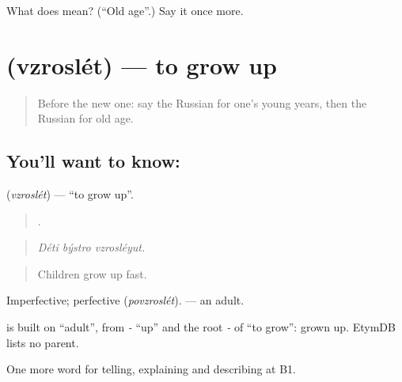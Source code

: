 \begin{tcolorbox}[breakable,colback=teal!4,colframe=teal!35!black,title={Before you move on}]
What does  mean? (\textquotedblleft{}Old age\textquotedblright{}.) Say it once more.
\end{tcolorbox}
\section[\texorpdfstring{\ru{взрослеть} (vzroslét)}{взрослеть (vzroslét)}]{ (vzroslét) — to grow up}

\label{lesson:RU-C304-vzroslet}



\begin{quote}
Before the new one: say the Russian for one's young years, then the Russian for old age.
\end{quote}

\subsection*{You'll want to know: }
\textbf{} (\emph{vzroslét}) — \textquotedblleft{}to grow up\textquotedblright{}.

\begin{quote}
  .
\end{quote}

\begin{quote}
\emph{Déti býstro vzrosléyut.}
\end{quote}

\begin{quote}
Children grow up fast.
\end{quote}

Imperfective; perfective \emph{} (\emph{povzroslét}). \emph{} — an adult.

\begin{cousinweb}
\emph{} is built on \emph{} \textquotedblleft{}adult\textquotedblright{}, from \emph{-} \textquotedblleft{}up\textquotedblright{} and the root \emph{-} of \emph{} \textquotedblleft{}to grow\textquotedblright{}: grown up. EtymDB lists no parent.
\end{cousinweb}

\begin{grammarlens}[title={What you've built}]
One more word for telling, explaining and describing at B1.
\end{grammarlens}

